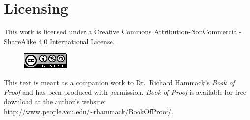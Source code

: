 \chapter*{Licensing}

This work is licensed under a Creative Commons Attribution-NonCommercial-ShareAlike 4.0 International License.


\begin{figure}[H]
\includegraphics[scale=1]{CCLicense.png}
\end{figure}

This text is meant as a companion work to Dr.~Richard Hammack's \textit{Book of Proof} and has been produced with permission.  \textit{Book of Proof} is available for free download at the author's website: \url{http://www.people.vcu.edu/~rhammack/BookOfProof/}.




